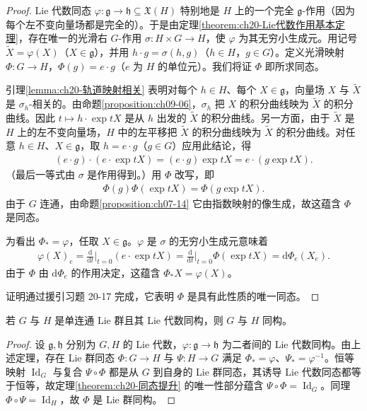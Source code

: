 \documentclass[../../main.tex]{subfiles}
\begin{document}
\begin{proof}
Lie 代数同态 $\varphi\colon\mathfrak g\to\mathfrak h\subseteq\mathfrak X(H)$ 特别地是 $H$ 上的一个完全 $\mathfrak g$-作用（因为每个左不变向量场都是完全的）。于是由定理\cref{theorem:ch20-Lie代数作用基本定理}，存在唯一的光滑右 $G$-作用 $\sigma\colon H\times G\to H$，使 $\varphi$ 为其无穷小生成元。用记号 $\widetilde X=\varphi(X)$（$X\in\mathfrak g$），并用 $h\cdot g=\sigma(h,g)$（$h\in H$，$g\in G$）。定义光滑映射 $\Phi\colon G\to H$，$\Phi(g)=e\cdot g$（$e$ 为 $H$ 的单位元）。我们将证 $\Phi$ 即所求同态。

引理\cref{lemma:ch20-轨道映射相关} 表明对每个 $h\in H$、每个 $X\in\mathfrak g$，向量场 $X$ 与 $\widetilde X$ 是 $\sigma_h$-相关的。由命题\cref{proposition:ch09-06}，$\sigma_h$ 把 $X$ 的积分曲线映为 $\widetilde X$ 的积分曲线。因此 $t\mapsto h\cdot\exp tX$ 是从 $h$ 出发的 $\widetilde X$ 的积分曲线。另一方面，由于 $\widetilde X$ 是 $H$ 上的左不变向量场，$H$ 中的左平移把 $\widetilde X$ 的积分曲线映为 $\widetilde X$ 的积分曲线。对任意 $h\in H$、$X\in\mathfrak g$，取 $h=e\cdot g$（$g\in G$）应用此结论，得
\begin{align*}
(e\cdot g)\cdot(e\cdot\exp tX)=(e\cdot g)\exp tX=e\cdot(g\exp tX).
\end{align*}
（最后一等式由 $\sigma$ 是作用得到。）用 $\Phi$ 改写，即
\begin{align*}
\Phi(g)\Phi(\exp tX)=\Phi(g\exp tX).
\end{align*}
由于 $G$ 连通，由命题\cref{proposition:ch07-14} 它由指数映射的像生成，故这蕴含 $\Phi$ 是同态。

为看出 $\Phi_*=\varphi$，任取 $X\in\mathfrak g$。$\varphi$ 是 $\sigma$ 的无穷小生成元意味着
\begin{align*}
\varphi(X)_e=\frac{\mathrm{d}}{\mathrm{d}t}\bigg|_{t=0}(e\cdot\exp tX)=\frac{\mathrm{d}}{\mathrm{d}t}\bigg|_{t=0}\Phi(\exp tX)=\mathrm{d}\Phi_e(X_e).
\end{align*}
由于 $\Phi$ 由 $\mathrm{d}\Phi_e$ 的作用决定，这蕴含 $\Phi_*X=\varphi(X)$。

证明通过援引习题 20-17 完成，它表明 $\Phi$ 是具有此性质的唯一同态。
\end{proof}

\begin{corollary}\label{corollary:ch20-单连通同构}
若 $G$ 与 $H$ 是单连通 Lie 群且其 Lie 代数同构，则 $G$ 与 $H$ 同构。
\end{corollary}

\begin{proof}
设 $\mathfrak g,\mathfrak h$ 分别为 $G,H$ 的 Lie 代数，$\varphi\colon\mathfrak g\to\mathfrak h$ 为二者间的 Lie 代数同构。由上述定理，存在 Lie 群同态 $\Phi\colon G\to H$ 与 $\Psi\colon H\to G$ 满足 $\Phi_*=\varphi$、$\Psi_*=\varphi^{-1}$。恒等映射 $\operatorname{Id}_G$ 与复合 $\Psi\circ\Phi$ 都是从 $G$ 到自身的 Lie 群同态，其诱导 Lie 代数同态都等于恒等，故定理\cref{theorem:ch20-同态提升} 的唯一性部分蕴含 $\Psi\circ\Phi=\operatorname{Id}_G$。同理 $\Phi\circ\Psi=\operatorname{Id}_H$，故 $\Phi$ 是 Lie 群同构。
\end{proof}
\end{document}

